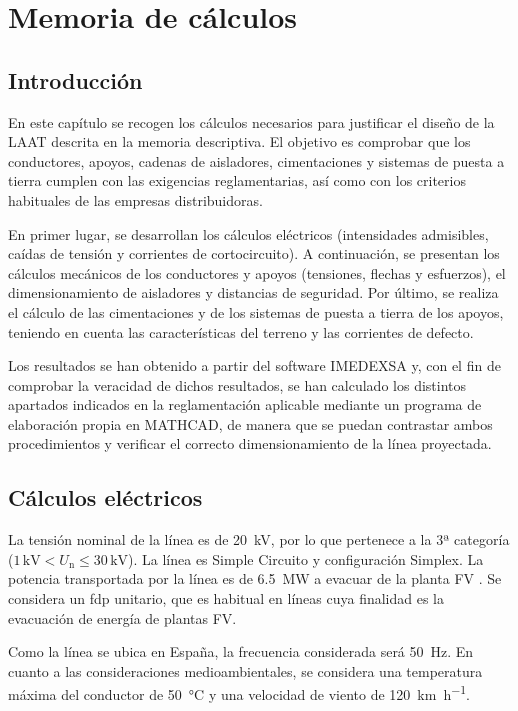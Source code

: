 \chapter{Memoria de cálculos}
\label{ch:mc}
\section{Introducción}
\label{sec:mc-introduccion}
En este capítulo se recogen los cálculos necesarios para justificar el diseño de la \ac{LAAT} descrita en la memoria descriptiva. El objetivo es comprobar que los conductores, apoyos, cadenas de aisladores, cimentaciones y sistemas de puesta a tierra cumplen con las exigencias reglamentarias, así como con los criterios habituales de las empresas distribuidoras.

En primer lugar, se desarrollan los cálculos eléctricos (intensidades admisibles, caídas de tensión y corrientes de cortocircuito). A continuación, se presentan los cálculos mecánicos de los conductores y apoyos (tensiones, flechas y esfuerzos), el dimensionamiento de aisladores y distancias de seguridad. Por último, se realiza el cálculo de las cimentaciones y de los sistemas de puesta a tierra de los apoyos, teniendo en cuenta las características del terreno y las corrientes de defecto.

Los resultados se han obtenido a partir del software IMEDEXSA y, con el fin de comprobar la veracidad de dichos resultados, se han calculado los distintos apartados indicados en la reglamentación aplicable mediante un programa de elaboración propia en MATHCAD, de manera que se puedan contrastar ambos procedimientos y verificar el correcto dimensionamiento de la línea proyectada.
\section{Cálculos eléctricos}
\label{sec:mc-electricos}
La tensión nominal de la línea es de \SI{20}{\kilo\volt}, por lo que pertenece a la 3ª categoría ($1\,\text{kV} < U_\text{n} \leq 30\,\text{kV}$). La línea es Simple Circuito y configuración Simplex. La potencia transportada por la línea es de \SI{6.5}{\mega\watt} a evacuar de la planta \acs{FV} . Se considera un \ac{fdp} unitario, que es habitual en líneas cuya finalidad es la evacuación de energía de plantas \acs{FV}.

Como la línea se ubica en España, la frecuencia considerada será \SI{50}{\hertz}. En cuanto a las consideraciones medioambientales, se considera una temperatura máxima del conductor de \SI{50}{\celsius} y una velocidad de viento de \SI{120}{\kilo\meter\per\hour}.

